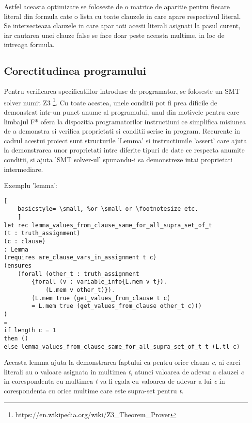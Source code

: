 Astfel aceasta optimizare se foloseste de o matrice de aparitie pentru fiecare literal din formula cate o lista cu toate clauzele in care apare respectivul literal.  \newline  Se intersecteaza clauzele in care apar toti acesti literali asignati la pasul curent, iar  \newline  cautarea unei clauze false se face doar peste aceasta multime, in loc de intreaga  \newline  formula.

\subsection{Corectitudinea programului}

Pentru verificarea specificatiilor introduse de programator, se foloseste un SMT solver numit Z3 \footnote{https://en.wikipedia.org/wiki/Z3\_Theorem\_Prover}.
Cu toate acestea, unele conditii pot fi prea dificile de demonstrat intr-un punct anume al programului, unul din motivele pentru care limbajul F* ofera la dispozitia programatorilor  instructiuni ce simplifica misiunea de a demonstra si \newline  verifica proprietati si conditii scrise in program. Recurente in cadrul acestui proiect sunt structurile 'Lemma' si instructiunile 'assert' care ajuta la demonstrarea unor proprietati intre diferite tipuri de date ce respecta anumite conditii, si ajuta 'SMT solver-ul' spunandu-i sa demonstreze intai proprietati intermediare.

Exemplu 'lemma':
\begin{lstlisting}[
	basicstyle= \small, %or \small or \footnotesize etc.
	]
let rec lemma_values_from_clause_same_for_all_supra_set_of_t
(t : truth_assignment) 
(c : clause) 
: Lemma
(requires are_clause_vars_in_assignment t c)
(ensures 
	(forall (other_t : truth_assignment
		{forall (v : variable_info{L.mem v t}). 
			(L.mem v other_t)}).
		(L.mem true (get_values_from_clause t c) 
		= L.mem true (get_values_from_clause other_t c)))
)
= 
if length c = 1 
then ()
else lemma_values_from_clause_same_for_all_supra_set_of_t t (L.tl c)

\end{lstlisting}

Aceasta lemma ajuta la demonstrarea faptului ca pentru orice clauza \textit{c}, ai carei literali au o valoare asignata in multimea \textit{t}, atunci valoarea de adevar a clauzei \textit{c} in corespondenta cu multimea \textit{t} va fi egala cu valoarea de adevar a lui \textit{c} in corespondenta cu orice multime care este supra-set pentru \textit{t}.

